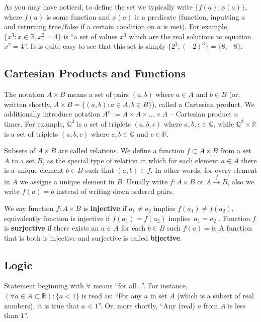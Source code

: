 \documentclass[../lecture-notes-148x210.tex]{subfiles}
\begin{document}
As you may have noticed, to define the set we typically write $\{f(a): \phi(a)\}$, where $f(a)$ is some 
function and $\phi(a)$ is a predicate (function, inputting $a$ and returning true/false if a certain condition 
on $a$ is met). For example, $\{x^3: x \in \mathbb{R}, x^2 = 4\}$ is ``a set of values $x^3$ which are the real 
solutions to equation $x^2 = 4$''. It is quite easy to see that this set is simply $\{2^3, (-2)^3\} = \{8,-8\}$. 

\subsection*{Cartesian Products and Functions}

The notation $A \times B$ means a set of pairs $(a,b)$ where $a \in A$ and $b \in B$ (or, written shortly, 
$A \times B = \{(a,b): a \in A, b \in B\}$), called a Cartesian product. We additionally introduce notation 
$A^n := A \times A \times \dots \times A$ -- Cartesian product $n$ times. For example, $\mathbb{Q}^3$ is a set of triplets 
$(a,b,c)$ where $a,b,c \in \mathbb{Q}$, while $\mathbb{Q}^2 \times \mathbb{R}$ is a set of triplets $(a,b,c)$ where 
$a,b \in \mathbb{Q}$ and $c \in \mathbb{R}$.

Subsets of $ A \times B$ are called relations. We define a function $f \subset A \times B$ from a set $A$ to a set $B$, as 
the special type of relation in which for each element $a \in A$ there is a unique element $b \in B$ such that $(a, b) \in f$.
In other words, for every element in $A$ we assigns a unique element in $B$. Usually write $f : A \times B$ or $A \xrightarrow{f} B$,
also we write $f(a) = b$ instead of writing down ordered pairs.

We say function $f : A \times B$ is \textbf{injective} if $a_1 \neq a_2$ implies $f(a_1) \neq f(a_2)$, equivalently 
function is injective if $f(a_1) = f(a_2)$ implies~$a_1 = a_2$ \cite{hungerford2013}. Function $f$ is \textbf{surjective} if there exists an $a \in A$ for
each $b \in B$ such $f(a) = b$. A function that is both is injective and surjective is called \textbf{bijective}.


\subsection*{Logic}

Statement beginning with $\forall$ means ``for all...''. For instance, $(\forall a \in A \subset \mathbb{R}): \{a < 1\}$ is 
read as: ``For any $a$ in set $A$ (which is a subset of real numbers), it is true that $a<1$''. Or, more shortly, ``Any (real) 
$a$ from $A$ is less than $1$''.
\end{document}

